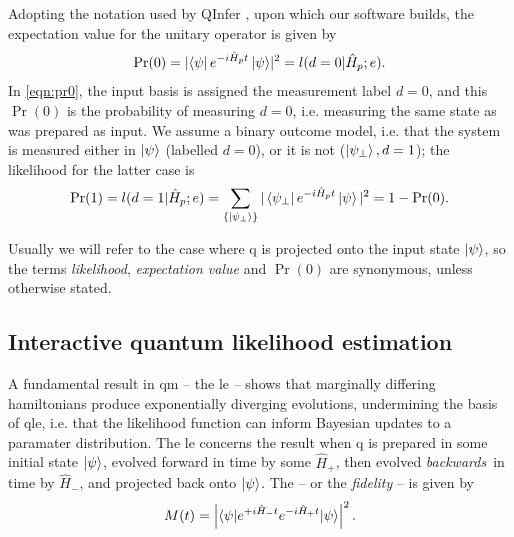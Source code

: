 Adopting the notation used by QInfer \cite{qinfer-1_0}, upon which our software builds, 
    the \gls{expectation value} for the unitary operator is given by
\begin{equation}\label{eqn:pr0}
    \Pr(0) =  \lvert \bra{\psi} e^{-i \hat{H}_p t} \ket{\psi}\rvert^2  = l(d=0 | \hat{H}_p; e).
\end{equation}
In \cref{eqn:pr0}, the input basis is assigned the measurement label $d=0$, and this $\Pr(0)$ is the probability 
    of measuring $d=0$, i.e. measuring the same state as was prepared as input. 
We assume a binary outcome model\footnotemark, 
    i.e. that the system is measured either in $\ket{\psi}$ (labelled $d=0$), or it is not ($\ket{\psi_{\perp}}, d=1$);
    the \gls{likelihood} for the latter case is
\begin{equation}\label{eqn:pr1}
    \Pr(1) = l(d=1 | \hat{H}_p; e) = \sum_{\{\ket{\psi_{\perp}}\}} | \bra{\psi_{\perp}} e^{-i \hat{H}_p t} \ket{\psi}  |^2 = 1 - \Pr(0).
\end{equation}

\par 
Usually we will refer to the case where \gls{q} is projected onto the input state $\ket{\psi}$, 
    so the terms \emph{likelihood}, \emph{\gls{expectation value}} and \emph{$\Pr(0)$} are synonymous, 
    unless otherwise stated. 


\subsection{Interactive quantum likelihood estimation}\label{sec:iqle}
A fundamental result in \gls{qm} -- the \gls{le} -- shows that marginally differing \glspl{hamiltonian} 
    produce exponentially diverging evolutions,  undermining the basis of \gls{qle}, 
    i.e. that the likelihood function can inform Bayesian updates to a paramater distribution. 
The \gls{le} concerns the result when \gls{q} is prepared in some initial state $\ket{\psi}$, 
    evolved forward in time by some $\hat{H}_+$, then evolved \emph{backwards}\footnotemark \ in time by $\hat{H}_{-}$,
    and projected back onto $\ket{\psi}$. 
The  -- or the \emph{fidelity} -- is given by 
\begin{equation}
    \label{eqn:loschmidt_echo}
    M(t) = \left\lvert  \braket{ \psi | e^{+i\hat{H}_{-} t} e^{-i \hat{H}_{+} t} | \psi}  \right\rvert^2.
\end{equation}
\par

